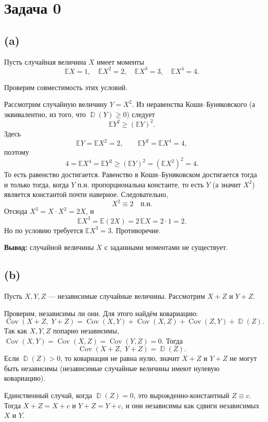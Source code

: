\documentclass[12pt]{article}
\DeclareMathOperator{\Var}{\mathbb{D}}
\DeclareMathOperator{\Cov}{Cov}
\newcommand{\E}{\mathbb{E}}
\begin{document}
    \section*{Задача 0}

    \subsection*{(a)}
    Пусть случайная величина $X$ имеет моменты
    \[
        \E X = 1,\quad
        \E X^2 = 2,\quad
        \E X^3 = 3,\quad
        \E X^4 = 4.
    \]

    Проверим совместимость этих условий.

    Рассмотрим случайную величину $Y = X^2$. Из неравенства Коши--Буняковского (а эквивалентно, из того, что $\Var(Y)\ge 0$) следует
    \[
        \E Y^2 \ge (\E Y)^2.
    \]
    Здесь
    \[
        \E Y = \E X^2 = 2,\qquad
        \E Y^2 = \E X^4 = 4,
    \]
    поэтому
    \[
        4 = \E X^4 = \E Y^2 \ge (\E Y)^2 = (\E X^2)^2 = 4.
    \]
    То есть равенство достигается. Равенство в Коши--Буняковском достигается тогда и только тогда, когда $Y$ п.н. пропорциональна константе, то есть $Y$ (а значит $X^2$) является константой почти наверное. Следовательно,
    \[
        X^2 \equiv 2 \quad \text{п.н.}
    \]
    Отсюда $X^3 = X\cdot X^2 = 2X$, и
    \[
        \E X^3 = \E(2X) = 2\,\E X = 2\cdot 1 = 2.
    \]
    Но по условию требуется $\E X^3 = 3$. Противоречие.

    \medskip
    \noindent
    \textbf{Вывод:} случайной величины $X$ с заданными моментами не существует.

    \subsection*{(b)}
    Пусть $X,Y,Z$ --- независимые случайные величины. Рассмотрим $X+Z$ и $Y+Z$.

    Проверим, независимы ли они. Для этого найдём ковариацию:
    \[
        \Cov(X+Z,\; Y+Z)
        = \Cov(X,Y) + \Cov(X,Z) + \Cov(Z,Y) + \Var(Z).
    \]
    Так как $X,Y,Z$ попарно независимы, $\Cov(X,Y)=\Cov(X,Z)=\Cov(Y,Z)=0$. Тогда
    \[
        \Cov(X+Z,\; Y+Z) = \Var(Z).
    \]
    Если $\Var(Z)>0$, то ковариация не равна нулю, значит $X+Z$ и $Y+Z$ не могут быть независимы (независимые случайные величины имеют нулевую ковариацию).

    Единственный случай, когда $\Var(Z)=0$, это вырожденно-константный $Z\equiv c$. Тогда $X+Z = X+c$ и $Y+Z = Y+c$, и они независимы как сдвиги независимых $X$ и $Y$.
\end{document}
